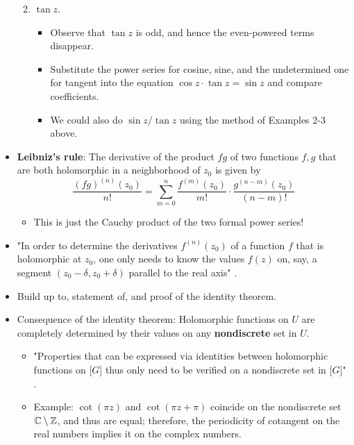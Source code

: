 \documentclass[../notes.tex]{subfiles}
\begin{document}
\begin{itemize}
\begin{enumerate}
\begin{itemize}
        \end{itemize}
        \item $\tan z$.
        \begin{itemize}
            \item Observe that $\tan z$ is odd, and hence the even-powered terms disappear.
            \item Substitute the power series for cosine, sine, and the undetermined one for tangent into the equation $\cos z\cdot\tan z=\sin z$ and compare coefficients.
            \item We could also do $\sin z/\tan z$ using the method of Examples 2-3 above.
        \end{itemize}
    \end{enumerate}
    \item \textbf{Leibniz's rule}: The derivative of the product $fg$ of two functions $f,g$ that are both holomorphic in a neighborhood of $z_0$ is given by
    \begin{equation*}
        \frac{(fg)^{(n)}(z_0)}{n!} = \sum_{m=0}^n\frac{f^{(m)}(z_0)}{m!}\cdot\frac{g^{(n-m)}(z_0)}{(n-m)!}
    \end{equation*}
    \begin{itemize}
        \item This is just the Cauchy product of the two formal power series!
    \end{itemize}
    \item "In order to determine the derivatives $f^{(n)}(z_0)$ of a function $f$ that is holomorphic at $z_0$, one only needs to know the values $f(z)$ on, say, a segment $(z_0-\delta,z_0+\delta)$ parallel to the real axis" \parencite[52]{bib:FischerLieb}.
    \item Build up to, statement of, and proof of the identity theorem.
    \item Consequence of the identity theorem: Holomorphic functions on $U$ are completely determined by their values on any \textbf{nondiscrete} set in $U$.
    \begin{itemize}
        \item "Properties that can be expressed via identities between holomorphic functions on [$G$] thus only need to be veriﬁed on a nondiscrete set in [$G$]" \parencite[53]{bib:FischerLieb}.
        \item Example: $\cot(\pi z)$ and $\cot(\pi z+\pi)$ coincide on the nondiscrete set $\mathbb{C}\setminus\mathbb{Z}$, and thus are equal; therefore, the periodicity of cotangent on the real numbers implies it on the complex numbers.

\end{itemize}
\end{itemize}
\end{document}
